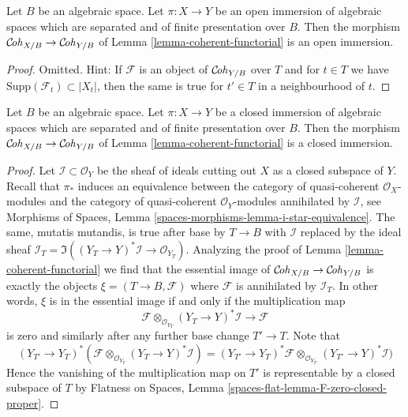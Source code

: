 \begin{lemma}
\label{lemma-coherent-open}
Let $B$ be an algebraic space. Let $\pi : X \to Y$ be an open immersion
of algebraic spaces which are separated and of finite presentation over $B$.
Then the morphism $\mathcal{C}\!\mathit{oh}_{X/B} \to \mathcal{C}\!\mathit{oh}_{Y/B}$ of
Lemma \ref{lemma-coherent-functorial} is an open immersion.
\end{lemma}

\begin{proof}
Omitted. Hint: If $\mathcal{F}$ is an object of $\mathcal{C}\!\mathit{oh}_{Y/B}$ over $T$
and for $t \in T$ we have $\text{Supp}(\mathcal{F}_t) \subset |X_t|$,
then the same is true for $t' \in T$ in a neighbourhood of $t$.
\end{proof}

\begin{lemma}
\label{lemma-coherent-closed}
Let $B$ be an algebraic space. Let $\pi : X \to Y$ be a closed immersion
of algebraic spaces which are separated and of finite presentation over $B$.
Then the morphism $\mathcal{C}\!\mathit{oh}_{X/B} \to \mathcal{C}\!\mathit{oh}_{Y/B}$ of
Lemma \ref{lemma-coherent-functorial} is a closed immersion.
\end{lemma}

\begin{proof}
Let $\mathcal{I} \subset \mathcal{O}_Y$ be the sheaf of ideals cutting
out $X$ as a closed subspace of $Y$. Recall that $\pi_*$ induces
an equivalence between the category of quasi-coherent $\mathcal{O}_X$-modules
and the category of quasi-coherent $\mathcal{O}_Y$-modules annihilated
by $\mathcal{I}$, see Morphisms of Spaces, Lemma
\ref{spaces-morphisms-lemma-i-star-equivalence}.
The same, mutatis mutandis, is true after base by $T \to B$ with
$\mathcal{I}$ replaced by the ideal sheaf
$\mathcal{I}_T = \Im((Y_T \to Y)^*\mathcal{I} \to \mathcal{O}_{Y_T})$.
Analyzing the proof of Lemma \ref{lemma-coherent-functorial}
we find that the essential image of
$\mathcal{C}\!\mathit{oh}_{X/B} \to \mathcal{C}\!\mathit{oh}_{Y/B}$
is exactly the objects $\xi = (T \to B, \mathcal{F})$
where $\mathcal{F}$ is annihilated by $\mathcal{I}_T$.
In other words, $\xi$ is in the essential image if and only if
the multiplication map
$$
\mathcal{F} \otimes_{\mathcal{O}_{Y_T}} (Y_T \to Y)^*\mathcal{I}
\longrightarrow
\mathcal{F}
$$
is zero and similarly after any further base change $T' \to T$.
Note that
$$
(Y_{T'} \to Y_T)^*(
\mathcal{F} \otimes_{\mathcal{O}_{Y_T}} (Y_T \to Y)^*\mathcal{I}) =
(Y_{T'} \to Y_T)^*\mathcal{F} \otimes_{\mathcal{O}_{Y_{T'}}}
(Y_{T'} \to Y)^*\mathcal{I})
$$
Hence the vanishing of the multiplication map on $T'$
is representable by a closed subspace of $T$ by
Flatness on Spaces, Lemma \ref{spaces-flat-lemma-F-zero-closed-proper}.
\end{proof}


